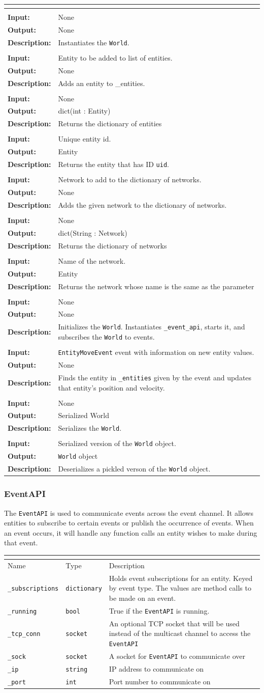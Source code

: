 \documentclass[titlepage]{article}
\newcommand{\operations}[1]{
\begin{center}
    \begin{longtable}{|p{4cm}|p{10cm + 2.0\tabcolsep}|}
    \hline
    \multicolumn{2}{|l|}{\cellcolor[gray]{0.5}{\textbf{Operations}}} \\ \hline
#1
    \end{longtable}
\end{center}
}
\newcommand{\operation}[4]{
    \hline
    \multicolumn{2}{|l|}{\cellcolor[gray]{0.8}{\texttt{#1}}} \\ \hline
    \hspace{7pt}\textbf{Input:} & #2 \\ \hline
    \hspace{7pt}\textbf{Output:} & #3 \\ \hline
    \hspace{7pt}\textbf{Description:} & #4 \\ \hline
}
\newcommand{\attributes}[1]{
    \begin{center}
        \begin{tabular}{|p{3cm}|p{3cm}|p{8cm}|}
            \multicolumn{3}{|l|}{\cellcolor[gray]{0.5}{\textbf{Attributes}}} \\ \hline
            \rowcolor[gray]{0.8} Name & Type & Description \\ \hline 
            #1
        \end{tabular}
    \end{center}
}
\newcommand{\attribute}[3]{
    \texttt{#1} & \texttt{#2} & #3 \\ \hline
}
\begin{document}
\operations{
    \operation{\_\_init\_\_()}{None}{None}{Instantiates the \texttt{World}.}
    \operation{add\_entity(entity)}{Entity to be added to list of entities.}{None}{Adds an entity to \_entities.}
    \operation{get\_entities()}{None}{dict(int : Entity)}{Returns the dictionary of entities}
    \operation{get\_entity(uid)}{Unique entity id.}{Entity}{Returns the entity that has ID \texttt{uid}.}
    \operation{add\_network(network)}{Network to add to the dictionary of networks.}{None}{Adds the given network to the dictionary of networks. }
    \operation{get\_networks()}{None}{dict(String : Network)}{Returns the dictionary of networks}
    \operation{get\_network(name)}{Name of the network.}{Entity}{Returns the network whose name is the same as the parameter}
    \operation{initialize()}{None}{None}{Initializes the \texttt{World}. Instantiates \texttt{\_event\_api}, starts it, and subscribes the \texttt{World} to events.}
    \operation{\_on\_entity\_move(event)}{\texttt{EntityMoveEvent} event with information on new entity values.}{None}{Finds the entity in \texttt{\_entities} given by the event and updates that entity's position and velocity.}
    \operation{pickle()}{None}{Serialized World}{Serializes the \texttt{World}.}
    \operation{from\_pickle(pickled)}{Serialized version of the \texttt{World} object.}{\texttt{World} object}{Deserializes a pickled verson of the \texttt{World} object.}
}
    
\subsubsection{EventAPI}
{The \texttt{EventAPI} is used to communicate events across the event channel. It allows entities to subscribe to certain events or publish the occurrence of events. When an event occurs, it will handle any function calls an entity wishes to make during that event.}

\attributes{
    \attribute{\_subscriptions}{dictionary}{Holds event subscriptions for an entity. Keyed by event type. The values are method calls to be made on an event.}
    \attribute{\_running}{bool}{True if the \texttt{EventAPI} is running.}
    \attribute{\_tcp\_conn}{socket}{An optional TCP socket that will be used instead of the multicast channel to access the \texttt{EventAPI}}
    \attribute{\_sock}{socket}{A socket for \texttt{EventAPI} to communicate over}
    \attribute{\_ip}{string}{IP address to communicate on}
    \attribute{\_port}{int}{Port number to communicate on}
}
\end{document}
